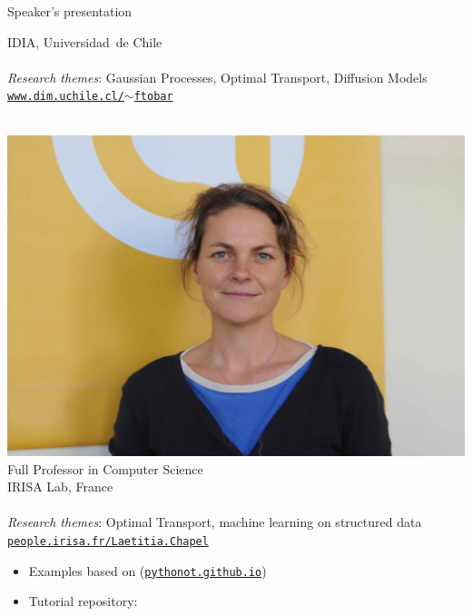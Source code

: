 \documentclass[pdf,aspectratio=169,10pt]{beamer}
\begin{document}
\begin{frame}{Speaker's presentation}
\begin{minipage}{0.45\textwidth}
IDIA, Universidad~de Chile\\
~\\
\emph{Research themes}: Gaussian Processes, Optimal Transport, Diffusion Models\\
\href{https://www.dim.uchile.cl/~ftobar/}{\texttt{www.dim.uchile.cl/$\sim$ftobar}}
\end{minipage}
\begin{minipage}{0.45\textwidth}
    \centering
    \\
\includegraphics[trim={50cm 15cm 45cm 12cm},clip,height=0.2\textheight]{../img/LC_light.jpg}\\
Full Professor in Computer Science\\
IRISA Lab, France\\
~\\
\emph{Research themes}: Optimal Transport, machine learning on structured data \\
\href{https://people.irisa.fr/Laetitia.Chapel/}{\texttt{people.irisa.fr/Laetitia.Chapel}}
\end{minipage}

\vspace{1em}
\begin{itemize}
    \item Examples based on  (\href{https://pythonot.github.io/}{\texttt{pythonot.github.io}})
    \item Tutorial repository: 
\end{itemize}
\end{frame}
\end{document}
